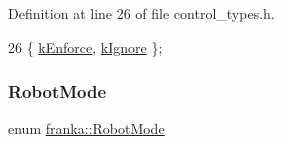Definition at line 26 of file control\+\_\+types.\+h.


\begin{DoxyCode}
26 \{ \hyperlink{namespacefranka_aeede4f4629390fea21ca5e5a35a8a943a024bd586d70db805d622b85815bfa0de}{kEnforce}, \hyperlink{namespacefranka_aeede4f4629390fea21ca5e5a35a8a943aa7c4e68b845afc4ee4dcaf41b0b503e4}{kIgnore} \};
\end{DoxyCode}
\mbox{\label{namespacefranka_adfe059ae23ebbad59e421edaa879651a}} 
\subsubsection{\texorpdfstring{Robot\+Mode}{RobotMode}}
{\footnotesize\ttfamily enum \hyperlink{namespacefranka_adfe059ae23ebbad59e421edaa879651a}{franka\+::\+Robot\+Mode}\hspace{0.3cm}{\ttfamily [strong]}}

